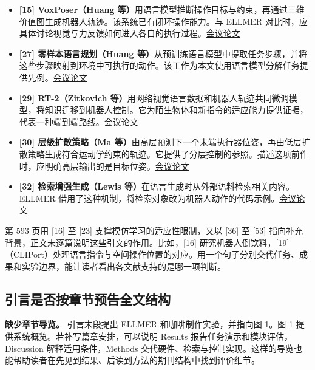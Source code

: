 \documentclass[UTF8,11pt,a4paper,twoside,fontset=none,heading=false]{ctexart}
\providecommand{\tightlist}{}
\begin{document}
\begin{itemize}
\tightlist
\item
  \textbf{{[}15{]} VoxPoser（Huang 等）}用语言模型推断操作目标与约束，再通过三维价值图生成机器人轨迹。该系统已有闭环操作能力。与 ELLMER 对比时，应具体讨论视觉与力反馈如何进入各自的执行过程。\href{https://proceedings.mlr.press/v229/huang23b.html}{会议论文}
\item
  \textbf{{[}27{]} 零样本语言规划（Huang 等）}从预训练语言模型中提取任务步骤，并将这些步骤映射到环境中可执行的动作。该工作为本文使用语言模型分解任务提供先例。\href{https://proceedings.mlr.press/v162/huang22a.html}{会议论文}
\item
  \textbf{{[}29{]} RT-2（Zitkovich 等）}用网络视觉语言数据和机器人轨迹共同微调模型，将知识迁移到机器人控制。它为陌生物体和新指令的适应能力提供证据，代表一种端到端路线。\href{https://proceedings.mlr.press/v229/zitkovich23a.html}{会议论文}
\item
  \textbf{{[}30{]} 层级扩散策略（Ma 等）}由高层预测下一个末端执行器位姿，再由低层扩散策略生成符合运动学约束的轨迹。它提供了分层控制的参照。描述这项前作时，应明确高层输出的是目标位姿。\href{https://openaccess.thecvf.com/content/CVPR2024/html/Ma_Hierarchical_Diffusion_Policy_for_Kinematics-Aware_Multi-Task_Robotic_Manipulation_CVPR_2024_paper.html}{会议论文}
\item
  \textbf{{[}32{]} 检索增强生成（Lewis 等）}在语言生成时从外部语料检索相关内容。ELLMER 借用了这种机制，将检索对象改为机器人动作的代码示例。\href{https://proceedings.nips.cc/paper/2020/hash/6b493230205f780e1bc26945df7481e5-Abstract.html}{会议论文}
\end{itemize}

第 593 页用 {[}16{]} 至 {[}23{]} 支撑模仿学习的适应性限制，又以 {[}36{]} 至 {[}53{]} 指向补充背景，正文未逐篇说明这些引文的作用。比如，{[}16{]} 研究机器人倒饮料，{[}19{]}（CLIPort）处理语言指令与空间操作位置的对应。用一个句子分别交代任务、成果和实验边界，能让读者看出各文献支持的是哪一项判断。

\subsection{引言是否按章节预告全文结构}

\textbf{缺少章节导览。} 引言末段提出 ELLMER 和咖啡制作实验，并指向图 1。图 1 提供系统概览。若补写篇章安排，可以说明 Results 报告任务演示和模块评估，Discussion 解释适用条件，Methods 交代硬件、检索与控制实现。这样的导览也能帮助读者在先见到结果、后读到方法的期刊结构中找到评价细节。
\end{document}
